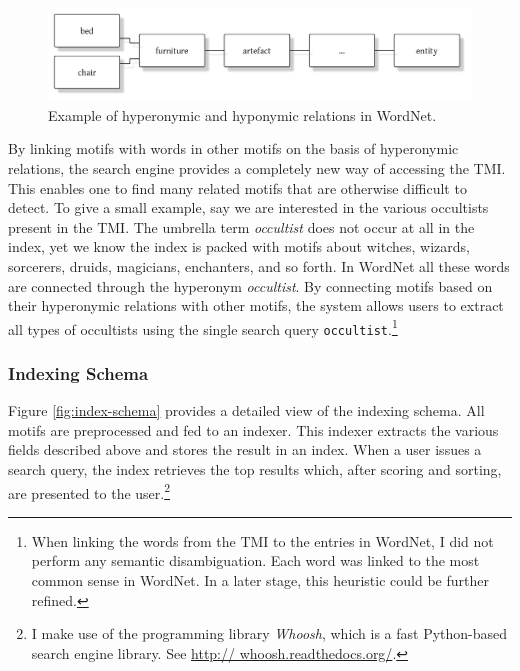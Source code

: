 \begin{figure}
    \centering
    \includegraphics[width=\textwidth]{images/wordnet-example.pdf}
    \caption{Example of hyperonymic and hyponymic relations in WordNet.}
    \label{fig:wordnet-example}
\end{figure}

By linking motifs with words in other motifs on the basis of hyperonymic relations, the search engine provides a completely new way of accessing the TMI. This enables one to find many related motifs that are otherwise difficult to detect. To give a small example, say we are interested in the various occultists present in the TMI. The umbrella term \emph{occultist} does not occur at all in the index, yet we know the index is packed with motifs about witches, wizards, sorcerers, druids, magicians, enchanters, and so forth. In WordNet all these words are connected through the hyperonym \emph{occultist}. By connecting motifs based on their hyperonymic relations with other motifs, the system allows users to extract all types of occultists using the single search query \texttt{occultist}.\footnote{When linking the words from the TMI to the entries in WordNet, I did not perform any semantic disambiguation. Each word was linked to the most common sense in WordNet. In a later stage, this heuristic could be further refined.}

\subsubsection{Indexing Schema}

Figure \ref{fig:index-schema} provides a detailed view of the indexing schema. All motifs are preprocessed and fed to an indexer. This indexer extracts the various fields described above and stores the result in an index. When a user issues a search query, the index retrieves the top results which, after scoring and sorting, are presented to the user.\footnote{I make use of the programming library \emph{Whoosh}, which is a fast Python-based search engine library. See \url{http:// whoosh.readthedocs.org/}.}

